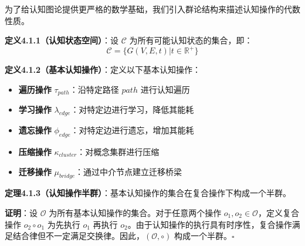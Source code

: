 \documentclass[12pt,a4paper]{article}
\newcommand{\cognitivespace}{\mathcal{C}}
\begin{document}
为了给认知图论提供更严格的数学基础，我们引入群论结构来描述认知操作的代数性质。

\textbf{定义4.1.1（认知状态空间）}：设 $\cognitivespace$ 为所有可能认知状态的集合，即：
\begin{equation}
\cognitivespace = \{G(V,E,t) | t \in \mathbb{R}^+\}
\end{equation}

\textbf{定义4.1.2（基本认知操作）}：定义以下基本认知操作：
\begin{itemize}
\item \textbf{遍历操作} $\tau_{path}$：沿特定路径 $path$ 进行认知遍历
\item \textbf{学习操作} $\lambda_{edge}$：对特定边进行学习，降低其能耗
\item \textbf{遗忘操作} $\phi_{edge}$：对特定边进行遗忘，增加其能耗
\item \textbf{压缩操作} $\kappa_{cluster}$：对概念集群进行压缩
\item \textbf{迁移操作} $\mu_{bridge}$：通过中介节点建立迁移桥梁
\end{itemize}

\textbf{定理4.1.3（认知操作半群）}：基本认知操作的集合在复合操作下构成一个半群。

\textbf{证明}：设 $\mathcal{O}$ 为所有基本认知操作的集合。对于任意两个操作 $o_1, o_2 \in \mathcal{O}$，定义复合操作 $o_2 \circ o_1$ 为先执行 $o_1$ 再执行 $o_2$。由于认知操作的执行具有时序性，复合操作满足结合律但不一定满足交换律。因此，$(\mathcal{O}, \circ)$ 构成一个半群。$\square$
\end{document}
